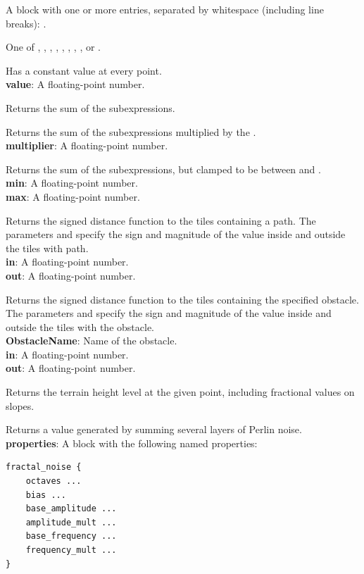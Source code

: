 A block with one or more  entries, separated by whitespace (including line breaks): .

One of , , , , , , , , or .

Has a constant value at every point.\\
\textbf{value}: A floating-point number.

Returns the sum of the subexpressions.

Returns the sum of the subexpressions multiplied by the .\\
\textbf{multiplier}: A floating-point number.

Returns the sum of the subexpressions, but clamped to be between  and .\\
\textbf{min}: A floating-point number.\\
\textbf{max}: A floating-point number.

Returns the signed distance function to the tiles containing a path.
The parameters  and  specify the sign and magnitude of the value inside and outside the tiles with path.\\
\textbf{in}: A floating-point number.\\
\textbf{out}: A floating-point number.

Returns the signed distance function to the tiles containing the specified obstacle.
The parameters  and  specify the sign and magnitude of the value inside and outside the tiles with the obstacle.\\
\textbf{ObstacleName}: Name of the obstacle.\\
\textbf{in}: A floating-point number.\\
\textbf{out}: A floating-point number.

Returns the terrain height level at the given point, including fractional values on slopes.

Returns a value generated by summing several layers of Perlin noise.\\
\textbf{properties}: A block with the following named properties:
\begin{verbatim}
fractal_noise {
    octaves ...
    bias ...
    base_amplitude ...
    amplitude_mult ...
    base_frequency ...
    frequency_mult ...
}
\end{verbatim}

